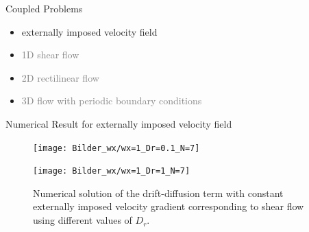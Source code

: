 
\begin{frame}{Coupled Problems}
	\begin{itemize}
		\item externally imposed velocity field \checkmark
		\item \textcolor{gray}{1D shear flow} \checkmark
         \item \textcolor{gray}{2D rectilinear flow \checkmark}
         \item \textcolor{gray}{3D flow with periodic boundary conditions}
	\end{itemize}
\end{frame}

\begin{frame}{Numerical Result for externally imposed velocity field}
		\scriptsize
		\begin{figure}[H]
			\centering
			\begin{minipage}{0.45\textwidth}
				\texttt{[image: Bilder\_wx/wx=1\_Dr=0.1\_N=7]}
			\end{minipage}
			\hfill 
			\begin{minipage}{0.45\textwidth}
				\texttt{[image: Bilder\_wx/wx=1\_Dr=1\_N=7]}
			\end{minipage}
			\caption{Numerical solution of the drift-diffusion term with constant externally imposed velocity gradient corresponding to shear flow using different values of $D_r$.}	
		\end{figure}
\end{frame}

